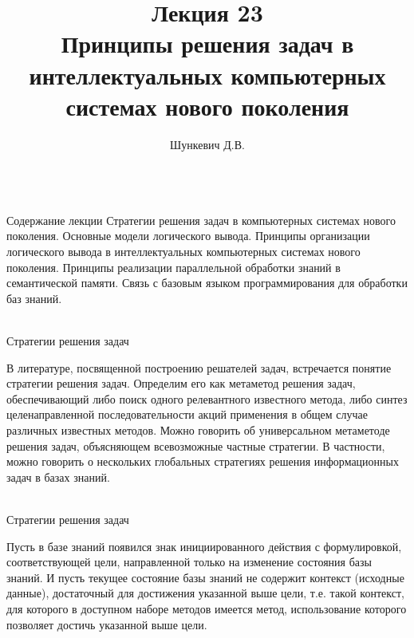 \title{Лекция 23\\Принципы решения задач в интеллектуальных компьютерных системах нового поколения}
\author[]{Шункевич Д.В.}

\begin{frame}
	\titlepage
\end{frame}

\begin{frame}{\\Содержание лекции}
	\topline
	\justifying
	Стратегии решения задач в компьютерных системах нового поколения. Основные модели логического вывода. Принципы организации логического вывода в интеллектуальных компьютерных системах нового поколения. Принципы реализации параллельной обработки знаний в семантической памяти. Связь с базовым языком программирования для обработки баз знаний. 
\end{frame}

\begin{frame}{\\Стратегии решения задач}
    \begin{scn}
    В литературе, посвященной построению решателей задач, встречается понятие стратегии решения задач. Определим его как метаметод решения задач, обеспечивающий либо поиск одного релевантного известного метода, либо синтез целенаправленной последовательности акций применения в общем случае различных известных методов. Можно говорить об универсальном метаметоде решения задач, объясняющем всевозможные частные стратегии. В частности, можно говорить о нескольких глобальных стратегиях решения информационных задач в базах знаний.
    \end{scn}
\end{frame}

\begin{frame}{\\Стратегии решения задач}
    \begin{scn}
Пусть в базе знаний появился знак инициированного действия с формулировкой, соответствующей цели, направленной только на изменение состояния базы знаний. И пусть текущее состояние базы знаний не содержит контекст (исходные данные), достаточный для достижения указанной выше цели, т.е. такой контекст, для которого в доступном наборе методов имеется метод, использование которого позволяет достичь указанной выше цели.
    \end{scn}
\end{frame}

